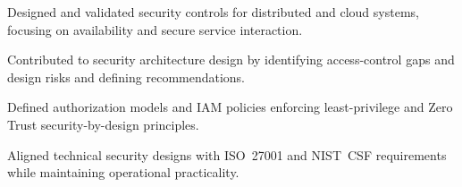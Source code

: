 

\vspace{1mm}

\begin{cvitems}
  \item {Designed and validated security controls for distributed and cloud systems, focusing on availability and secure service interaction.}
    \item {Contributed to security architecture design by identifying access-control gaps and design risks and defining recommendations.}
  \item {Defined authorization models and IAM policies enforcing least-privilege and Zero Trust security-by-design principles.}
  \item {Aligned technical security designs with ISO~27001 and NIST~CSF requirements while maintaining operational practicality.}
\end{cvitems}

\vspace{4mm}
